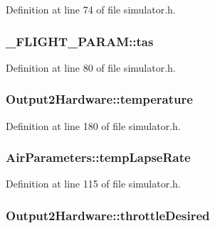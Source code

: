 Definition at line 74 of file simulator.\-h.

\hypertarget{group___h_i_t_l_plugin_gad3fafd24c05ec4da9b2b230dfe6eec23}{
\subsubsection[{tas}]{ \-\_\-\-F\-L\-I\-G\-H\-T\-\_\-\-P\-A\-R\-A\-M\-::tas}}\label{group___h_i_t_l_plugin_gad3fafd24c05ec4da9b2b230dfe6eec23}


Definition at line 80 of file simulator.\-h.

\hypertarget{group___h_i_t_l_plugin_ga925c7971d40c91b63e480e5f89096747}{
\subsubsection[{temperature}]{ Output2\-Hardware\-::temperature}}\label{group___h_i_t_l_plugin_ga925c7971d40c91b63e480e5f89096747}


Definition at line 180 of file simulator.\-h.

\hypertarget{group___h_i_t_l_plugin_gae5608554d84c53cb81499d63b9381f9f}{
\subsubsection[{temp\-Lapse\-Rate}]{ Air\-Parameters\-::temp\-Lapse\-Rate}}\label{group___h_i_t_l_plugin_gae5608554d84c53cb81499d63b9381f9f}


Definition at line 115 of file simulator.\-h.

\hypertarget{group___h_i_t_l_plugin_gab6902f4f38e771b9d499521d861661f2}{
\subsubsection[{throttle\-Desired}]{ Output2\-Hardware\-::throttle\-Desired}}\label{group___h_i_t_l_plugin_gab6902f4f38e771b9d499521d861661f2}


